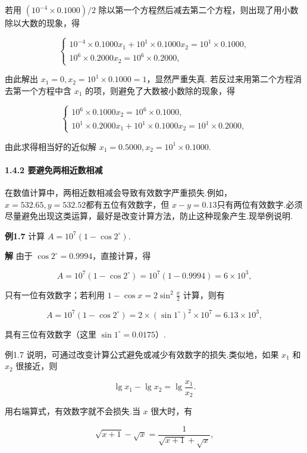 \documentclass[
  10pt,
  fontset=fandol]{ctexart}
\begin{document}
若用 \((10^{-4} \times 0.1000)/2\) 除以第一个方程然后减去第二个方程，则出现了用小数除以大数的现象，得

\[
\begin{cases} 10^{-4} \times 0.1000x_1 + 10^1 \times 0.1000x_2 = 10^1 \times 0.1000, \\ 10^6 \times 0.2000x_2 = 10^6 \times 0.2000, \end{cases}
\]

由此解出 \(x_1=0, x_2=10^1 \times 0.1000=1\)，显然严重失真. 若反过来用第二个方程消去第一个方程中含 \(x_1\) 的项，则避免了大数被小数除的现象，得

\[
\begin{cases} 10^6 \times 0.1000x_2 = 10^6 \times 0.1000, \\ 10^1 \times 0.2000x_1 + 10^1 \times 0.1000x_2 = 10^1 \times 0.2000, \end{cases}
\]

由此求得相当好的近似解 \(x_1=0.5000, x_2=10^1 \times 0.1000\).

\paragraph{1.4.2 要避免两相近数相减}\label{ux8981ux907fux514dux4e24ux76f8ux8fd1ux6570ux76f8ux51cf}

在数值计算中，两相近数相减会导致有效数字严重损失.例如，\(x=532.65, y=532.52\)都有五位有效数字，但 \(x-y=0.13\)只有两位有效数字.必须尽量避免出现这类运算，最好是改变计算方法，防止这种现象产生.现举例说明.

\textbf{例1.7} 计算 \(A=10^7(1-\cos 2^\circ)\).

\textbf{解} 由于 \(\cos 2^\circ=0.9994\)，直接计算，得

\[
A=10^7(1-\cos 2^\circ)=10^7(1-0.9994)=6 \times 10^3,
\]

只有一位有效数字；若利用 \(1-\cos x=2\sin^2\frac{x}{2}\) 计算，则有

\[
A=10^7(1-\cos 2^\circ)=2 \times (\sin 1^\circ)^2 \times 10^7=6.13 \times 10^3,
\]

具有三位有效数字（这里 \(\sin 1^\circ=0.0175\)）.

例1.7 说明，可通过改变计算公式避免或减少有效数字的损失.类似地，如果 \(x_1\) 和 \(x_2\) 很接近，则

\[
\lg x_1-\lg x_2=\lg \frac{x_1}{x_2}.
\]

用右端算式，有效数字就不会损失.当 \(x\) 很大时，有

\[
\sqrt{x+1}-\sqrt{x}=\frac{1}{\sqrt{x+1}+\sqrt{x}},
\]
\end{document}

